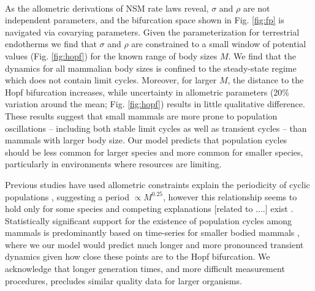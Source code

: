 \documentclass{pnastwo}
\begin{document}
\begin{article}
\vspace{2mm}
 \\ \noindent


As the allometric derivations of NSM rate laws reveal, $\sigma$ and $\rho$ are not independent parameters, and the bifurcation space shown in Fig. \ref{fig:fp} is navigated via covarying parameters. Given the parameterization for terrestrial endotherms we find that $\sigma$ and $\rho$ are constrained to a small window of potential values (Fig. \ref{fig:hopf}) for the known range of body sizes $M$. We find that the dynamics for all mammalian body sizes is confined to the steady-state regime which does not contain limit cycles.
Moreover, for larger $M$, the distance to the Hopf bifurcation increases, while uncertainty in allometric parameters (20\% variation around the mean; Fig. \ref{fig:hopf}) results in little qualitative difference. These results suggest that small mammals are more prone to population oscillations -- including both stable limit cycles as well as transient cycles -- than mammals with larger body size. Our model predicts that population cycles should be less common for larger species and more common for smaller species, particularly in environments where resources are limiting.%

Previous studies have used allometric constraints explain the periodicity of cyclic populations \cite{CalderIII:1983jd,Peterson:1984hj,Krukonis:1991fk}, suggesting a period $\propto M^{0.25}$, however this relationship seems to hold only for some species \cite{Hendriks:2012fc} and competing explanations [related to ....] exist \cite{Kendall:1999iy,Hogstedt:2005cr}. 
Statistically significant support for the existence of population cycles among mammals is predominantly based on time-series for smaller bodied mammals \cite{Kendall:1998hl}, where we our model would predict much longer and more pronounced transient dynamics given how close these points are to the Hopf bifurcation. We acknowledge that longer generation times, and more difficult measurement procedures, precludes similar quality data for larger organisms.


\end{article}
\end{document}
